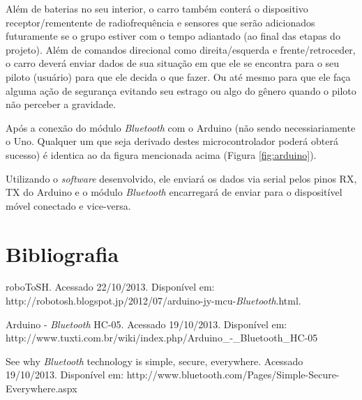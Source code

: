 \documentclass[portugues, brazil, a4paper,12pt]{article}
\begin{document}
Além de baterias no seu interior, o carro também conterá o dispositivo receptor/rementente de radiofrequência e sensores que serão adicionados futuramente se o grupo estiver com o tempo adiantado (ao final das etapas do projeto). Além de comandos direcional como direita/esquerda e frente/retroceder, o carro deverá enviar dados de sua situação em que ele se encontra para o seu piloto (usuário) para que ele decida o que fazer. Ou até mesmo para que ele faça alguma ação de segurança evitando seu estrago ou algo do gênero quando o piloto não perceber a gravidade.

Após a conexão do módulo \textit{Bluetooth} com o Arduino (não sendo necessiariamente o Uno. Qualquer um que seja derivado destes microcontrolador poderá obterá sucesso) é identica ao da figura mencionada acima (Figura \ref{fig:arduino}).

Utilizando o \textit{software} desenvolvido, ele enviará os dados via serial pelos pinos RX, TX do Arduino e o módulo \textit{Bluetooth} encarregará de enviar para o dispositível móvel conectado e vice-versa.





\newpage
\section{Bibliografia}
\begin{thebibliography}{100} %

 roboToSH. Acessado 22/10/2013. Disponível em: http://robotosh.blogspot.jp/2012/07/arduino-jy-mcu-\textit{Bluetooth}.html.

 Arduino - \textit{Bluetooth} HC-05. Acessado 19/10/2013. Disponível em: http://www.tuxti.com.br/wiki/index.php/Arduino\_-\_Bluetooth\_HC-05

 See why \textit{Bluetooth} technology is simple, secure, everywhere. Acessado 19/10/2013. Disponível em: http://www.bluetooth.com/Pages/Simple-Secure-Everywhere.aspx
\end{thebibliography}
\end{document}
